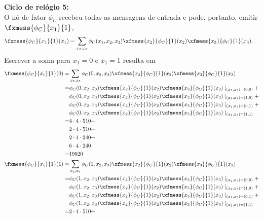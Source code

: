 \begin{exenumerate}
\begin{solution}
        { \bf Ciclo de rel\'ogio 5:}\\
        O n\'o de fator $\phi_C$ recebeu todas as mensagens de entrada e pode, portanto, emitir $\fxmess{\phi_C}{x_1}{1}$,
        \begin{align}
            \fxmess{\phi_C}{x_1}{1}(x_1) & = \sum_{x_2,x_3} \phi_C(x_1,x_2,x_3) \xfmess{x_2}{\phi_C}{1}(x_2)\xfmess{x_3}{\phi_C}{1}(x_3).
        \end{align}      
        Escrever a soma para $x_1=0$ e $x_1=1$ resulta em
        \begin{align}
            \fxmess{\phi_C}{x_1}{1}(0) = &  \sum_{x_2,x_3} \phi_C(0,x_2,x_3) \xfmess{x_2}{\phi_C}{1}(x_2) \xfmess{x_3}{\phi_C}{1}(x_3)\\
            = &  \phi_C(0,x_2,x_3) \xfmess{x_2}{\phi_C}{1}(x_2) \xfmess{x_3}{\phi_C}{1}(x_3) \mid_{(x_2,x_3)=(0,0)} +\\
            & \phi_C(0,x_2,x_3) \xfmess{x_2}{\phi_C}{1}(x_2) \xfmess{x_3}{\phi_C}{1}(x_3) \mid_{(x_2,x_3)=(1,0)} +\\
            & \phi_C(0,x_2,x_3) \xfmess{x_2}{\phi_C}{1}(x_2) \xfmess{x_3}{\phi_C}{1}(x_3) \mid_{(x_2,x_3)=(0,1)} +\\
            & \phi_C(0,x_2,x_3) \xfmess{x_2}{\phi_C}{1}(x_2) \xfmess{x_3}{\phi_C}{1}(x_3) \mid_{(x_2,x_3)=(1,1)}\\
            = & 4 \cdot 4 \cdot 510 +\\
            &  2 \cdot 4 \cdot 510 +  \\
            &  2 \cdot 4 \cdot 240  + \\
            &  6 \cdot 4 \cdot 240 \\
            = & 19920\\
            \fxmess{\phi_C}{x_1}{1}(1) = &  \sum_{x_2,x_3} \phi_C(1,x_2,x_3) \xfmess{x_2}{\phi_C}{1}(x_2) \xfmess{x_3}{\phi_C}{1}(x_3)\\
            = &  \phi_C(1,x_2,x_3) \xfmess{x_2}{\phi_C}{1}(x_2) \xfmess{x_3}{\phi_C}{1}(x_3) \mid_{(x_2,x_3)=(0,0)} +\\
            & \phi_C(1,x_2,x_3) \xfmess{x_2}{\phi_C}{1}(x_2) \xfmess{x_3}{\phi_C}{1}(x_3) \mid_{(x_2,x_3)=(1,0)} +\\
            & \phi_C(1,x_2,x_3) \xfmess{x_2}{\phi_C}{1}(x_2) \xfmess{x_3}{\phi_C}{1}(x_3) \mid_{(x_2,x_3)=(0,1)} +\\
            & \phi_C(1,x_2,x_3) \xfmess{x_2}{\phi_C}{1}(x_2) \xfmess{x_3}{\phi_C}{1}(x_3) \mid_{(x_2,x_3)=(1,1)}\\
            = & 2 \cdot 4 \cdot 510 +\\

\end{align}
\end{solution}
\end{exenumerate}
